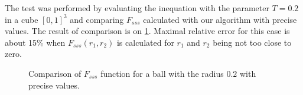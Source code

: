 \documentclass[1p]{elsarticle}
\begin{document}
The test was performed by evaluating the inequation with the parameter $T = 0.2$
in a cube $[0, 1]^3$ and comparing $F_{sss}$ calculated with our algorithm with
precise values. The result of comparison is on
\cref{fig:sss-verification}. Maximal relative error for this case is about  15\%
when $F_{sss}(r_1, r_2)$ is calculated for $r_1$ and $r_2$ being not too close
to zero.
\begin{figure}[tp]
  \centering
  \hfill
  \caption[]{Comparison of $F_{sss}$ function for a ball with the radius $0.2$
    with precise values.}
  \label{fig:sss-verification}
\end{figure}
\end{document}
